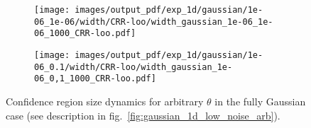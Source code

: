 \documentclass[a4paper,14pt]{extarticle}
\begin{document}
\begin{figure}
\begin{subfigure}[b]{0.25\linewidth}
    \caption{} \label{fig:gaussian_1d_low_noise_width_arb_c2}
  \end{subfigure}%
  \begin{subfigure}[b]{0.25\linewidth}
    \texttt{[image: images/output\_pdf/exp\_1d/gaussian/1e-06\_1e-06/width/CRR-loo/width\_gaussian\_1e-06\_1e-06\_1000\_CRR-loo.pdf]}
    \caption{} \label{fig:gaussian_1d_low_noise_width_arb_c3}
  \end{subfigure}%
  \begin{subfigure}[b]{0.25\linewidth}
    \texttt{[image: images/output\_pdf/exp\_1d/gaussian/1e-06\_0.1/width/CRR-loo/width\_gaussian\_1e-06\_0,1\_1000\_CRR-loo.pdf]}
    \caption{} \label{fig:gaussian_1d_low_noise_width_arb_c4}
  \end{subfigure}%
  \caption{Confidence region size dynamics for arbitrary $\theta$ in the fully Gaussian
  case (see description in fig.~\ref{fig:gaussian_1d_low_noise_arb}).}
  \label{fig:gaussian_1d_low_noise_width_arb}
\end{figure}
\end{document}
